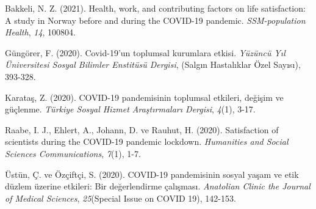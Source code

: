 \documentclass[
  12pt,
]{article}
\newlength{\cslhangindent}
\newlength{\cslentryspacingunit} %
\newenvironment{CSLReferences}[2] %
 {%
  \setlength{\parindent}{0pt}
  \ifodd #1
  \let\oldpar\par
  \def\par{\hangindent=\cslhangindent\oldpar}
  \fi
  \setlength{\parskip}{#2\cslentryspacingunit}
 }%
 {}
\begin{document}
\hypertarget{refs}{}
\begin{CSLReferences}{1}{0}
\leavevmode{}%
Bakkeli, N. Z. (2021). Health, work, and contributing factors on life satisfaction: A study in Norway before and during the COVID-19 pandemic. \emph{SSM-population Health}, \emph{14}, 100804.

\leavevmode{}%
Güngörer, F. (2020). Covid-19'un toplumsal kurumlara etkisi. \emph{Y{ü}z{ü}nc{ü} Y{ı}l {Ü}niversitesi Sosyal Bilimler Enstit{ü}s{ü} Dergisi}, (Salg{ı}n Hastal{ı}klar {Ö}zel Say{ı}s{ı}), 393-328.

\leavevmode{}%
Karataş, Z. (2020). COVID-19 pandemisinin toplumsal etkileri, de{ğ}i{ş}im ve g{ü}{ç}lenme. \emph{T{ü}rkiye Sosyal Hizmet Ara{ş}t{ı}rmalar{ı} Dergisi}, \emph{4}(1), 3-17.

\leavevmode{}%
Raabe, I. J., Ehlert, A., Johann, D. ve Rauhut, H. (2020). Satisfaction of scientists during the COVID-19 pandemic lockdown. \emph{Humanities and Social Sciences Communications}, \emph{7}(1), 1-7.

\leavevmode{}%
Üstün, Ç. ve Özçiftçi, S. (2020). COVID-19 pandemisinin sosyal ya{ş}am ve etik d{ü}zlem {ü}zerine etkileri: Bir de{ğ}erlendirme {ç}al{ı}{ş}mas{ı}. \emph{Anatolian Clinic the Journal of Medical Sciences}, \emph{25}(Special Issue on COVID 19), 142-153.

\end{CSLReferences}
\end{document}
